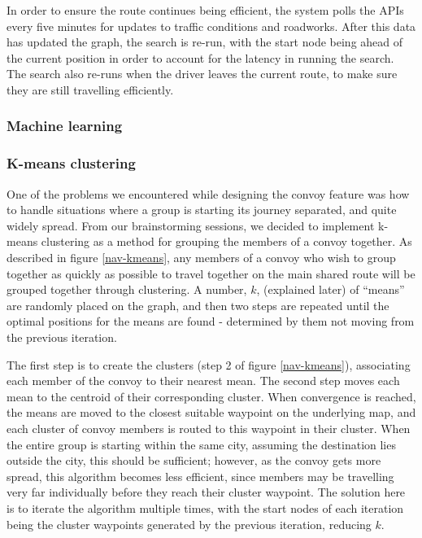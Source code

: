 \documentclass{article}
\begin{document}
In order to ensure the route continues being efficient, the system polls the APIs every five minutes for updates to traffic conditions and roadworks. After this data has updated the graph, the search is re-run, with the start node being ahead of the current position in order to account for the latency in running the search. The search also re-runs when the driver leaves the current route, to make sure they are still travelling efficiently.
\subsubsection{Machine learning}\label{sssec:nav-tech-machinelearning}
%
%
\subsubsection{K-means clustering}\label{sssec:nav-tech-kmeans}
One of the problems we encountered while designing the convoy feature was how to handle situations where a group is starting its journey separated, and quite widely spread. From our brainstorming sessions, we decided to implement k-means clustering as a method for grouping the members of a convoy together. As described in figure \ref{nav-kmeans}, any members of a convoy who wish to group together as quickly as possible to travel together on the main shared route will be grouped together through clustering. A number, $k$, (explained later) of ``means'' are randomly placed on the graph, and then two steps are repeated until the optimal positions for the means are found - determined by them not moving from the previous iteration. 

The first step is to create the clusters (step 2 of figure \ref{nav-kmeans}), associating each member of the convoy to their nearest mean. The second step moves each mean to the centroid of their corresponding cluster. When convergence is reached, the means are moved to the closest suitable waypoint on the underlying map, and each cluster of convoy members is routed to this waypoint in their cluster. When the entire group is starting within the same city, assuming the destination lies outside the city, this should be sufficient; however, as the convoy gets more spread, this algorithm becomes less efficient, since members may be travelling very far individually before they reach their cluster waypoint. The solution here is to iterate the algorithm multiple times, with the start nodes of each iteration being the cluster waypoints generated by the previous iteration, reducing $k$.
\end{document}
